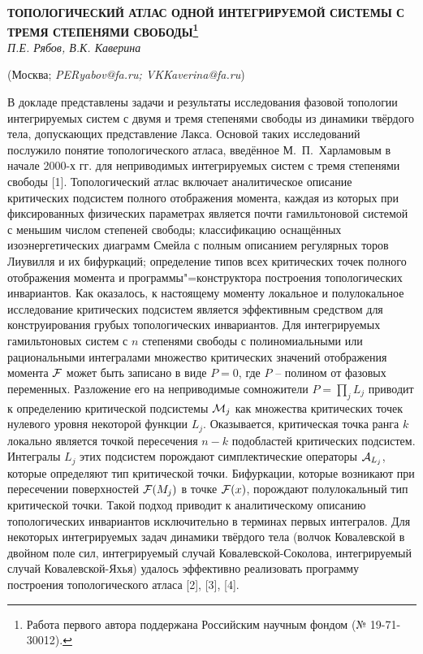 \begin{center}
    {\bf ТОПОЛОГИЧЕСКИЙ АТЛАС ОДНОЙ ИНТЕГРИРУЕМОЙ СИСТЕМЫ С ТРЕМЯ СТЕПЕНЯМИ СВОБОДЫ\footnote{Работа первого автора поддержана Российским научным фондом (№ 19-71-30012).}}\\

    {\it П.Е. Рябов, В.К. Каверина}

    (Москва; {\it PERyabov@fa.ru; VKKaverina@fa.ru})
\end{center}



В докладе представлены задачи и результаты исследования фазовой топологии интегрируемых систем с двумя и тремя степенями свободы из динамики твёрдого тела, допускающих представление Лакса. Основой таких исследований послужило понятие топологического атласа, введённое М.~П.~Харламовым в начале 2000-х гг. для неприводимых интегрируемых систем с тремя степенями свободы [1]. Топологический атлас включает аналитическое описание критических подсистем полного отображения момента, каждая из которых при фиксированных физических параметрах является почти гамильтоновой системой с меньшим числом степеней свободы; классификацию оснащённых изоэнергетических диаграмм Смейла с полным описанием регулярных торов Лиувилля и их бифуркаций; определение типов всех критических точек полного отображения момента и программы"=конструктора построения топологических инвариантов. Как оказалось, к настоящему моменту локальное и полулокальное исследование критических подсистем является эффективным средством для конструирования грубых топологических инвариантов. Для интегрируемых гамильтоновых систем с $n$ степенями свободы с полиномиальными или рациональными интегралами множество критических значений отображения момента $\cal F$ может быть записано в виде $P=0$, где $P$ -- полином от фазовых переменных. Разложение его на неприводимые сомножители $P=\prod\nolimits_j {L_j}$ приводит к определению критической подсистемы ${\cal M}_j$ как множества критических точек нулевого уровня некоторой функции $L_j$. Оказывается, критическая точка ранга $k$ локально является точкой пересечения $n-k$ подобластей критических подсистем. Интегралы $L_j$ этих подсистем порождают симплектические операторы ${\cal A}_{L_j}$, которые определяют тип критической точки. Бифуркации, которые возникают при пересечении поверхностей ${\cal F}(M_j)$ в точке
${\cal F}(x)$, порождают полулокальный тип критической точки. Такой подход приводит к аналитическому описанию топологических инвариантов исключительно в терминах первых интегралов. Для некоторых интегрируемых задач динамики твёрдого тела (волчок Ковалевской в двойном поле сил, интегрируемый случай Ковалевской-Соколова, интегрируемый случай Ковалевской-Яхья) удалось эффективно реализовать программу построения топологического атласа [2], [3], [4].

